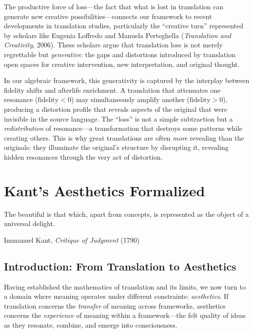 \begin{remark}
The productive force of loss---the fact that what is lost in translation can generate new creative possibilities---connects our framework to recent developments in translation studies, particularly the ``creative turn'' represented by scholars like Eugenia Loffredo and Manuela Perteghella (\textit{Translation and Creativity}, 2006).  These scholars argue that translation loss is not merely regrettable but \emph{generative}: the gaps and distortions introduced by translation open spaces for creative intervention, new interpretation, and original thought.

In our algebraic framework, this generativity is captured by the interplay between fidelity shifts and afterlife enrichment.  A translation that attenuates one resonance ($\mathrm{fidelity} < 0$) may simultaneously amplify another ($\mathrm{fidelity} > 0$), producing a distortion profile that reveals aspects of the original that were invisible in the source language.  The ``loss'' is not a simple subtraction but a \emph{redistribution} of resonance---a transformation that destroys some patterns while creating others.  This is why great translations are often \emph{more} revealing than the originals: they illuminate the original's structure by disrupting it, revealing hidden resonances through the very act of distortion.
\end{remark}



\chapter{Kant's Aesthetics Formalized}
\label{ch:kant-aesthetics}

\epigraph{The beautiful is that which, apart from concepts,
is represented as the object of a universal delight.}%
{Immanuel Kant, \emph{Critique of Judgment} (1790)}

\section{Introduction: From Translation to Aesthetics}

Having established the mathematics of translation and its limits, we now
turn to a domain where meaning operates under different constraints:
\emph{aesthetics}.  If translation concerns the \emph{transfer} of meaning
across frameworks, aesthetics concerns the \emph{experience} of meaning
within a framework---the felt quality of ideas as they resonate, combine,
and emerge into consciousness.

